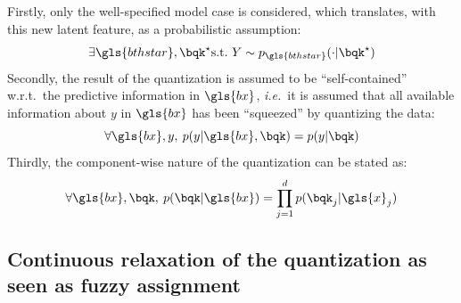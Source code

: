 Firstly, only the well-specified model case is considered, which translates, with this new latent feature, as a probabilistic assumption:
\begin{equation} \label{hyp:true}
\exists \gls{bthstar}, \bqk^\star \text{s.t.\ } Y \sim p_{\gls{bthstar}}(\cdot | \bqk^\star)
\end{equation}
Secondly, the result of the quantization is assumed to be ``self-contained'' w.r.t.\ the predictive information in $\gls{bx}$, \textit{i.e.}\ it is assumed that all available information about $y$ in $\gls{bx}$ has been ``squeezed'' by quantizing the data:
\begin{equation} \label{hyp:squeeze}
\forall \gls{bx},y,\: p(y|\gls{bx},\bqk) = p(y|\bqk)
\end{equation}
Thirdly, the component-wise nature of the quantization can be stated as:
\begin{equation} \label{hyp:component}
\forall \gls{bx},\bqk,\: p(\bqk|\gls{bx}) = \prod_{j=1}^d p(\bqk_j | \gls{x}_j)
\end{equation}



\subsection{Continuous relaxation of the quantization as seen as fuzzy assignment} \label{subsec:fuzzy}

